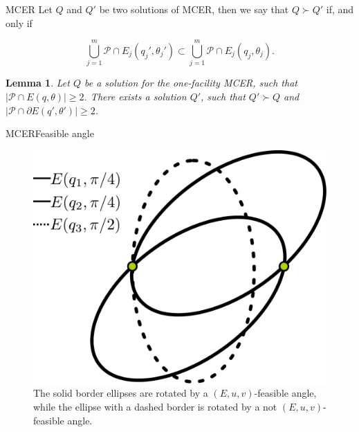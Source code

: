 \documentclass{beamer}
\newcommand{\Pp}{\mathscr{P}}
\newtheorem{lem}{Lemma}
\theoremstyle{definition}
\begin{document}
\begin{frame}{MCER}
Let $Q$ and $Q'$ be two solutions of MCER, then we say that $Q \succ Q'$ if, and only if

\begin{equation*}
\bigcup_{j=1}^m \Pp \cap E_j(q_j', \theta_j') \subset \bigcup_{j=1}^m \Pp \cap E_j(q_j, \theta_j).
\end{equation*}

\begin{lem}\label{lema:mce_2b}
	Let $Q$ be a solution for the one-facility MCER, such that $|\Pp \cap E(q, \theta)| \ge 2$.
	There exists a solution $Q'$, such that $Q' \succ Q$ and $|\Pp \cap \partial E(q', \theta')|\ge 2$.
\end{lem}
\end{frame}

\begin{frame}{MCER}{Feasible angle}
\begin{figure}[H]
	\centering
	\includegraphics[scale=.22]{../article/figures/feasible-angle2}
	\caption{The solid border ellipses are rotated by a $(E, u,v)$-feasible angle, while the ellipse with a dashed border is rotated by a not $(E, u, v)$-feasible angle.}
	\label{fig:feasible-angle}
\end{figure}
\end{frame}
\end{document}
